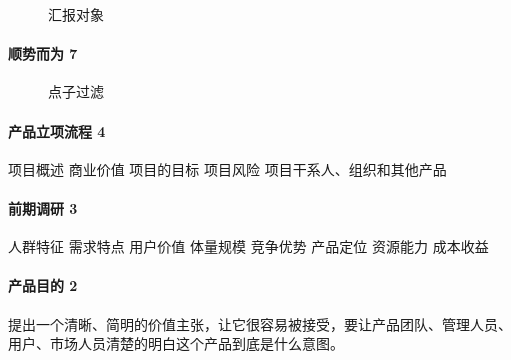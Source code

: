 \documentclass[letterpaper,11pt,english]{sphinxmanual}
\begin{document}
\begin{figure}[H]
\centering
\capstart

\noindent{}
\caption{汇报对象}\label{\detokenize{chapter_knowledge/BRD:id18}}\end{figure}


\paragraph{顺势而为 7\sphinxfootnotemark[410]}
\label{\detokenize{chapter_knowledge/BRD:id2}}%
\begin{footnotetext}[410]\sphinxAtStartFootnote
{}
%
\end{footnotetext}\ignorespaces 
\begin{figure}[H]
\centering
\capstart

\noindent{}
\caption{点子过滤}\label{\detokenize{chapter_knowledge/BRD:id19}}\end{figure}


\paragraph{产品立项流程 4\sphinxfootnotemark[411]}
\label{\detokenize{chapter_knowledge/BRD:id3}}%
\begin{footnotetext}[411]\sphinxAtStartFootnote
{}
%
\end{footnotetext}\ignorespaces 
项目概述 商业价值 项目的目标 项目风险 项目干系人、组织和其他产品


\paragraph{前期调研 3\sphinxfootnotemark[412]}
\label{\detokenize{chapter_knowledge/BRD:id4}}%
\begin{footnotetext}[412]\sphinxAtStartFootnote
{}
%
\end{footnotetext}\ignorespaces 
人群特征 需求特点 用户价值 体量规模 竞争优势 产品定位 资源能力 成本收益


\paragraph{产品目的 2\sphinxfootnotemark[413]}
\label{\detokenize{chapter_knowledge/BRD:id5}}%
\begin{footnotetext}[413]\sphinxAtStartFootnote
{}
%
\end{footnotetext}\ignorespaces 
提出一个清晰、简明的价值主张，让它很容易被接受，要让产品团队、管理人员、用户、市场人员清楚的明白这个产品到底是什么意图。
\end{document}

